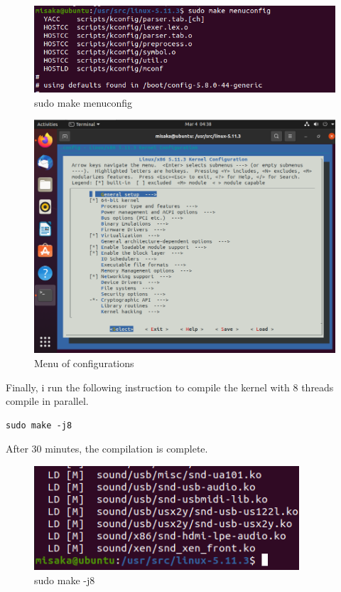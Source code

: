 \documentclass[UTF8,10pt,a4paper]{article}
\theoremstyle{Problem}
\theoremstyle{Solution}
\begin{document}
\begin{figure}[H]
    \centering
    \includegraphics[width=380pt]{7.png}
    \caption{sudo make menuconfig}
    \label{7}
\end{figure}

\begin{figure}[H]
    \centering
    \includegraphics[width=380pt]{6.png}
    \caption{Menu of configurations}
    \label{6}
\end{figure}

Finally, i run the following instruction to compile the kernel with 8 threads compile in parallel.

\begin{lstlisting}
sudo make -j8
\end{lstlisting}

After 30 minutes, the compilation is complete.

\begin{figure}[H]
    \centering
    \includegraphics[width=280pt]{9.png}
    \caption{sudo make -j8}
    \label{9}
\end{figure}
\end{document}

